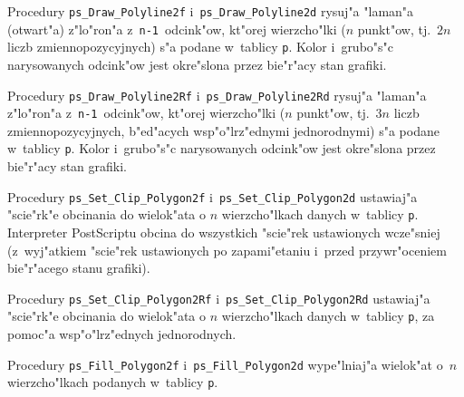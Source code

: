 \vspace{\bigskipamount}
Procedury \texttt{ps\_Draw\_Polyline2f} i~\texttt{ps\_Draw\_Polyline2d}
rysuj"a "laman"a (otwar\-t"a) z"lo"ron"a
z~\texttt{n-1}~odcink"ow, kt"orej wierzcho"lki ($n$ punkt"ow, tj.\ $2n$
liczb zmiennopozycyjnych) s"a podane w~tablicy \texttt{p}. Kolor i~grubo"s"c
narysowanych odcink"ow jest okre"slona przez bie"r"acy stan grafiki.

\vspace{\bigskipamount}
Procedury \texttt{ps\_Draw\_Polyline2Rf} i~\texttt{ps\_Draw\_Polyline2Rd}
rysuj"a "laman"a z"lo"ron"a z~\texttt{n-1}~odcink"ow, kt"orej wierzcho"lki
($n$ punkt"ow, tj.\ $3n$ liczb zmiennopozycyjnych, b"ed"acych wsp"o"lrz"ednymi
jednorodnymi) s"a podane w~tablicy \texttt{p}. Kolor i~grubo"s"c
narysowanych odcink"ow jest okre"slona przez bie"r"acy stan grafiki.

\vspace{\bigskipamount}
Procedury \texttt{ps\_Set\_Clip\_Polygon2f}
i~\texttt{ps\_Set\_Clip\_Polygon2d} ustawiaj"a "scie"r\-k"e obcinania do
wielok"ata o $n$ wierzcho"lkach danych w~tablicy \texttt{p}.
Interpreter PostScriptu obcina do wszystkich "scie"rek ustawionych
wcze"sniej (z~wyj"atkiem "scie"rek ustawionych po zapami"etaniu i~przed
przywr"oceniem bie"r"acego stanu grafiki).

\vspace{\bigskipamount}
\begin{sloppypar}
Procedury \texttt{ps\_Set\_Clip\_Polygon2Rf}
i~\texttt{ps\_Set\_Clip\_Polygon2Rd} ustawiaj"a "scie"r\-k"e obcinania do
wielok"ata o $n$ wierzcho"lkach danych w~tablicy \texttt{p}, za pomoc"a
wsp"o"lrz"ednych jednorodnych.%
\end{sloppypar}

\newpage
Procedury \texttt{ps\_Fill\_Polygon2f} i~\texttt{ps\_Fill\_Polygon2d}
wype"lniaj"a wielok"at o~$n$ wierzcho"lkach podanych w~tablicy \texttt{p}.

